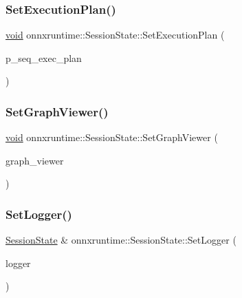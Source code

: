 \subsubsection{\texorpdfstring{Set\+Execution\+Plan()}{SetExecutionPlan()}}
{\footnotesize\ttfamily \mbox{\hyperlink{mlasi_8h_a88f941d423cb2a819b70a1358982b1a6}{void}} onnxruntime\+::\+Session\+State\+::\+Set\+Execution\+Plan (\begin{DoxyParamCaption}\item[{std\+::unique\+\_\+ptr$<$ \mbox{\hyperlink{structonnxruntime_1_1SequentialExecutionPlan}{Sequential\+Execution\+Plan}} $>$}]{p\+\_\+seq\+\_\+exec\+\_\+plan }\end{DoxyParamCaption})}

\mbox{\label{classonnxruntime_1_1SessionState_a82b05bf5a5bfff13a32242a3f70eed67}} 
\subsubsection{\texorpdfstring{Set\+Graph\+Viewer()}{SetGraphViewer()}}
{\footnotesize\ttfamily \mbox{\hyperlink{mlasi_8h_a88f941d423cb2a819b70a1358982b1a6}{void}} onnxruntime\+::\+Session\+State\+::\+Set\+Graph\+Viewer (\begin{DoxyParamCaption}\item[{std\+::unique\+\_\+ptr$<$ \mbox{\hyperlink{classonnxruntime_1_1GraphViewer}{onnxruntime\+::\+Graph\+Viewer}} $>$}]{graph\+\_\+viewer }\end{DoxyParamCaption})}

\mbox{\label{classonnxruntime_1_1SessionState_ac285bca58766bb80fa922aaeba828621}} 
\subsubsection{\texorpdfstring{Set\+Logger()}{SetLogger()}}
{\footnotesize\ttfamily \mbox{\hyperlink{classonnxruntime_1_1SessionState}{Session\+State}} \& onnxruntime\+::\+Session\+State\+::\+Set\+Logger (\begin{DoxyParamCaption}\item[{const \mbox{\hyperlink{classonnxruntime_1_1logging_1_1Logger}{logging\+::\+Logger}} \&}]{logger }\end{DoxyParamCaption})}

